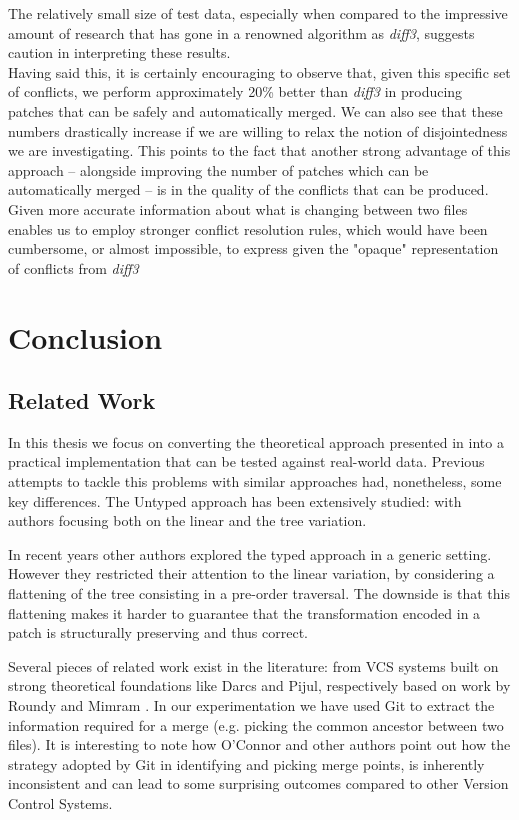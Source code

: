 \documentclass[11pt, titlepage]{article}
\newcommand{\diffthree}{\emph{diff3}\xspace}
\begin{document}
The relatively small size of test data, especially when compared to the impressive amount of research that has gone in a renowned algorithm as \emph{diff3}, suggests caution in interpreting these results. \\
Having said this, it is certainly encouraging to observe that, given this specific set of conflicts, we perform approximately 20\% better than \diffthree in producing patches that can be safely and automatically merged. We can also see that these numbers drastically increase if we are willing to relax the notion of disjointedness we are investigating. This points to the fact that another strong advantage of this approach -- alongside improving the number of patches which can be automatically merged -- is in the quality of the conflicts that can be produced. Given more accurate information about what is changing between two files enables us to employ stronger conflict resolution rules, which would have been cumbersome, or almost impossible, to express given the "opaque" representation of conflicts from \diffthree
\section{Conclusion}

\subsection{Related Work}\label{rel-work}
In this thesis we focus on converting the theoretical approach presented in \cite{type-directed-diff} into a practical implementation that can be tested against real-world data. Previous attempts to tackle this problems with similar approaches had, nonetheless, some key differences. 
The Untyped approach has been extensively studied: with authors focusing both on the linear \cite{diff, bergroth} and the tree \cite{Akutsu, klein,demanie, billie, autexier, chawalthe} variation. 

In recent years other authors explored the typed approach \cite{Vassena, Lempsink} in a generic setting. However they restricted their attention to the linear variation, by considering a flattening of the tree consisting in a pre-order traversal. The downside is that this flattening makes it harder to guarantee that the transformation encoded in a patch is structurally preserving and thus correct.

Several pieces of related work exist in the literature: from VCS systems built on strong theoretical foundations like Darcs and Pijul, respectively based on work by Roundy \cite{darcs} and Mimram \cite{cat-of-patches}. In our experimentation we have used Git to extract the information required for a merge (e.g. picking the common ancestor between two files). It is interesting to note how O'Connor \cite{git-inconsistent} and other authors point out how the strategy adopted by Git in identifying and picking merge points, is inherently inconsistent and can lead to some surprising outcomes compared to other Version Control Systems.
\end{document}
